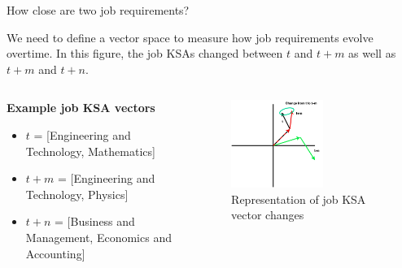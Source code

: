 \documentclass{beamer}
\begin{document}
\begin{frame}{How close are two job requirements?}

  We need to define a vector space to measure how job requirements evolve overtime. In this figure, the job KSAs changed between $t$ and $t+m$ as well as $t+m$ and $t+n$.

  \begin{columns}
    \begin{column}{0.5\textwidth}
      \textbf{Example job KSA vectors}
      \vspace{.25cm}
      \begin{itemize}
        \item $t$ = [Engineering and Technology, Mathematics]
        \item $t+m$ = [Engineering and Technology, Physics]
        \item $t+n$ = [Business and Management, Economics and Accounting]
      \end{itemize}
      
    \end{column}
    \begin{column}{0.5\textwidth}
      \begin{figure}[ht!]
        \centering
        \includegraphics[width=0.6\textwidth]{images/task_change_w_time.png}
        \caption{Representation of job KSA vector changes}
      \end{figure}\label{fig:change}
    \end{column}
  \end{columns}
\end{frame}
\end{document}
